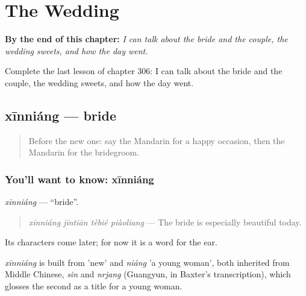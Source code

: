 
\chapter{The Wedding}
\label{ch:zh-the-wedding}

\begin{chapteropening}
\textbf{By the end of this chapter:} \emph{I can talk about the bride and the couple, the wedding sweets, and how the day went.}

Complete the last lesson of chapter 306: I can talk about the bride and the couple, the wedding sweets, and how the day went.
\end{chapteropening}

\section[xīnniáng]{xīnniáng — bride}

\label{lesson:ZH-C306-xinniang}



\begin{quote}
Before the new one: say the Mandarin for a happy occasion, then the Mandarin for the bridegroom.
\end{quote}

\subsection*{You'll want to know: xīnniáng}
\emph{xīnniáng} — \textquotedblleft{}bride\textquotedblright{}.

\begin{quote}
\emph{xīnniáng jīntiān tèbié piàoliang} — The bride is especially beautiful today.
\end{quote}

Its characters come later; for now it is a word for the ear.

\begin{cousinweb}
\emph{xīnniáng} is built from  'new' and \emph{niáng} 'a young woman', both inherited from Middle Chinese, \emph{sin} and \emph{nrjang} (Guangyun, in Baxter's transcription), which glosses the second as a title for a young woman.
\end{cousinweb}

